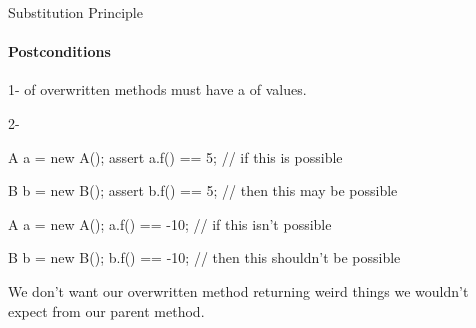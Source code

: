 \documentclass[week11]{csse2002}
\begin{document}
\begin{topic}{Substitution Principle}
\framesubtitle{Postconditions}

\begin{subtopic}{1-}
 of overwritten methods must have a  of values.
\end{subtopic}

\begin{subtopic}{2-}
\begin{java}
A a = new A();
assert a.f() == 5; // if this is possible

B b = new B();
assert b.f() == 5; // then this may be possible
\end{java}

\begin{java}
A a = new A();
a.f() == -10; // if this isn't possible

B b = new B();
b.f() == -10; // then this shouldn't be possible
\end{java}

We don't want our overwritten method returning weird things we wouldn't expect from our parent method.
\end{subtopic}
\end{topic}
\end{document}
